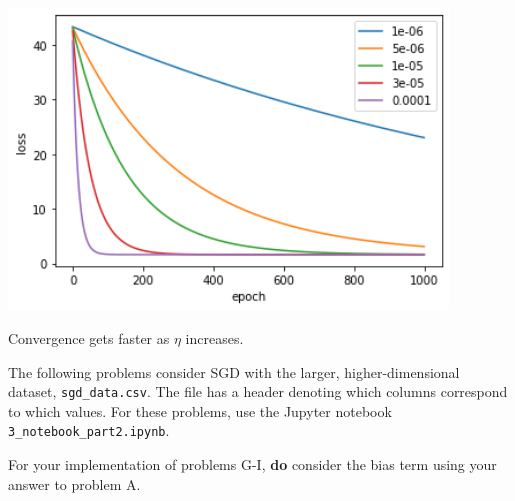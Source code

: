 \begin{solution}

  \includegraphics[height=8cm]{images/3f.png}

  Convergence gets faster as $\eta$ increases.
\end{solution}


The following problems consider SGD with the larger, higher-dimensional dataset, \texttt{sgd_data.csv}. The file has a header denoting which columns correspond to which values. For these problems, use the Jupyter notebook \texttt{3_notebook_part2.ipynb}.

For your implementation of problems G-I, \textbf{do} consider the bias term using your answer to problem A.

